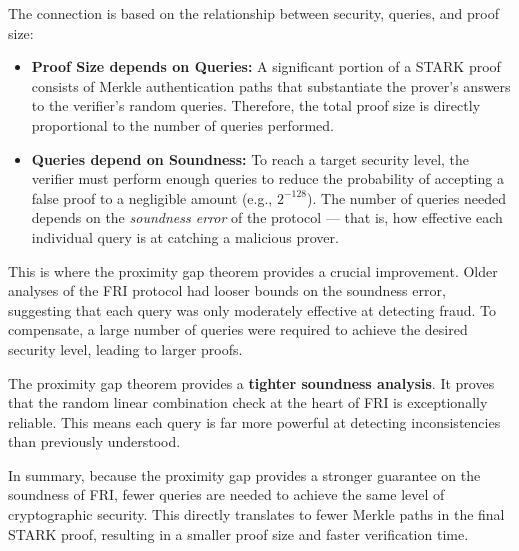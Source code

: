 \documentclass{article}
\begin{document}
The connection is based on the relationship between security, queries, and proof size:
\begin{itemize}
    \item \textbf{Proof Size depends on Queries:} A significant portion of a STARK proof consists of Merkle authentication paths that substantiate the prover's answers to the verifier's random queries. Therefore, the total proof size is directly proportional to the number of queries performed.
    \item \textbf{Queries depend on Soundness:} To reach a target security level, the verifier must perform enough queries to reduce the probability of accepting a false proof to a negligible amount (e.g., $2^{-128}$). The number of queries needed depends on the \textit{soundness error} of the protocol — that is, how effective each individual query is at catching a malicious prover.
\end{itemize}

This is where the proximity gap theorem provides a crucial improvement. Older analyses of the FRI protocol had looser bounds on the soundness error, suggesting that each query was only moderately effective at detecting fraud. To compensate, a large number of queries were required to achieve the desired security level, leading to larger proofs.

The proximity gap theorem provides a \textbf{tighter soundness analysis}. It proves that the random linear combination check at the heart of FRI is exceptionally reliable. This means each query is far more powerful at detecting inconsistencies than previously understood.

In summary, because the proximity gap provides a stronger guarantee on the soundness of FRI, fewer queries are needed to achieve the same level of cryptographic security. This directly translates to fewer Merkle paths in the final STARK proof, resulting in a smaller proof size and faster verification time.








\end{document}
